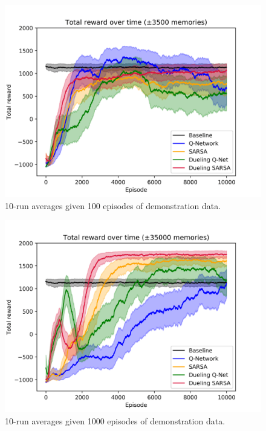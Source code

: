 \begin{figure}[H]
    \centering
    \includegraphics[width=\linewidth]{img/results/10-sized/total_rewards_100m-min.png}
    \caption{10-run averages given 100 episodes of demonstration data.}
    \label{fig:10sized-100mem}
\end{figure}
\begin{figure}[H]
    \centering
    \includegraphics[width=\linewidth]{img/results/10-sized/total_rewards_1000m-min.png}
    \caption{10-run averages given 1000 episodes of demonstration data.}
    \label{fig:10sized-1000mem}
\end{figure}
